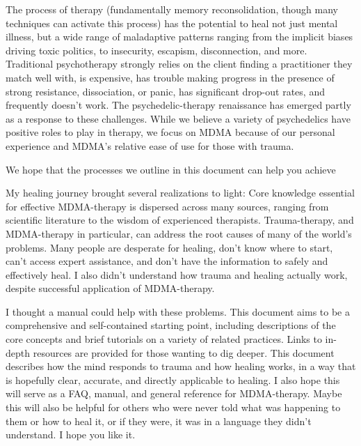 \documentclass[12pt,letterpaper]{article}
\begin{document}


The process of therapy (fundamentally memory reconsolidation, though many techniques can activate this process) has the potential to heal not just mental illness, but a wide range of maladaptive patterns ranging from the implicit biases driving toxic politics, to insecurity, escapism, disconnection, and more. Traditional psychotherapy strongly relies on the client finding a practitioner they match well with, is expensive, has trouble making progress in the presence of strong resistance, dissociation, or panic, has significant drop-out rates, and frequently doesn't work. The psychedelic-therapy renaissance has emerged partly as a response to these challenges. While we believe a variety of psychedelics have positive roles to play in therapy, we focus on MDMA because of our personal experience and MDMA's relative ease of use for those with trauma.

We hope that the processes we outline in this document can help you achieve 

My healing journey brought several realizations to light: Core knowledge essential for effective MDMA-therapy is dispersed across many sources, ranging from scientific literature to the wisdom of experienced therapists. Trauma-therapy, and MDMA-therapy in particular, can address the root causes of many of the world's problems. Many people are desperate for healing, don't know where to start, can't access expert assistance, and don't have the information to safely and effectively heal. I also didn't understand how trauma and healing actually work, despite successful application of MDMA-therapy. 

I thought a manual could help with these problems. This document aims to be a comprehensive and self-contained starting point, including descriptions of the core concepts and brief tutorials on a variety of related practices. Links to in-depth resources are provided for those wanting to dig deeper. This document describes how the mind responds to trauma and how healing works, in a way that is hopefully clear, accurate, and directly applicable to healing. I also hope this will serve as a FAQ, manual, and general reference for MDMA-therapy. Maybe this will also be helpful for others who were never told what was happening to them or how to heal it, or if they were, it was in a language they didn't understand. I hope you like it.
\end{document}
